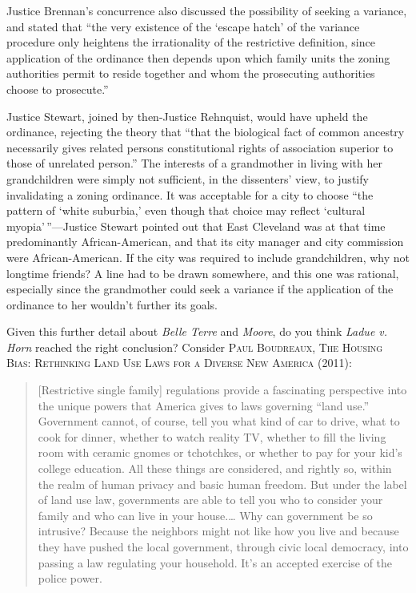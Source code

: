 Justice Brennan's concurrence also discussed the possibility of seeking a
variance, and stated that ``the very existence of the `escape hatch' of the
variance procedure only heightens the irrationality of the restrictive
definition, since application of the ordinance then depends upon which family
units the zoning authorities permit to reside together and whom the prosecuting
authorities choose to prosecute.''

Justice Stewart, joined by then-Justice Rehnquist, would have upheld the
ordinance, rejecting the theory that ``that the biological fact of common
ancestry necessarily gives related persons constitutional rights of association
superior to those of unrelated person.'' The interests of a grandmother in
living with her grandchildren were simply not sufficient, in the dissenters'
view, to justify invalidating a zoning ordinance. It was acceptable for a city
to choose ``the pattern of `white suburbia,' even though that choice may reflect
`cultural myopia'\,''---Justice Stewart pointed out that East Cleveland was at
that time predominantly African-American, and that its city manager and city
commission were African-American. If the city was required to include
grandchildren, why not longtime friends? A line had to be drawn somewhere, and
this one was rational, especially since the grandmother could seek a variance if
the application of the ordinance to her wouldn't further its goals. 

\item
Given this further detail about \textit{Belle Terre} and \textit{Moore}, do you
think \textit{Ladue v. Horn} reached the right conclusion? Consider \textsc{Paul
Boudreaux, The Housing Bias: Rethinking Land Use Laws for a Diverse New America}
(2011):
\begin{quote}
[Restrictive single family] regulations provide a fascinating perspective into
the unique powers that America gives to laws governing ``land use.'' Government
cannot, of course, tell you what kind of car to drive, what to cook for dinner,
whether to watch reality TV, whether to fill the living room with ceramic gnomes
or tchotchkes, or whether to pay for your kid's college education. All these
things are considered, and rightly so, within the realm of human privacy and
basic human freedom. But under the label of land use law, governments are able
to tell you who to consider your family and who can live in your house.\ldots
Why can government be so intrusive? Because the neighbors might not like how you
live and because they have pushed the local government, through civic local
democracy, into passing a law regulating your household. It's an accepted
exercise of the police power. 
\end{quote}

